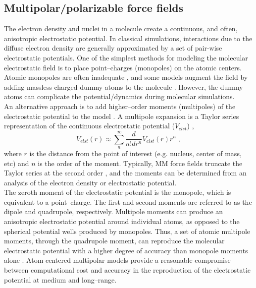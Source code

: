 \documentclass[12pt]{report}
\begin{document}
\subsection{Multipolar/polarizable force fields}

The electron density and nuclei in a molecule create a continuous, and often,
anisotropic electrostatic potential.
In classical simulations, interactions due to the diffuse electron density are
generally approximated by a set of pair-wise electrostatic potentials.
One of the simplest methods for modeling the molecular electrostatic field is
to place point--charges (monopoles) on the atomic centers.
Atomic monopoles are often inadequate \cite{Cisneros2014,Kramer2014}, and
some models augment the field by adding massless charged dummy atoms to the
molecule \cite{Jorgensen1983,Mahoney2000}.
However, the dummy atoms can complicate the potential/dynamics during
molecular simulations. \\

An alternative approach is to add higher--order moments (multipoles) of the
electrostatic potential to the model
\cite{Cisneros2014,Laury2015,Shi2013,Stone2013}.
A multipole expansion is a Taylor series representation of the continuous
electrostatic potential ($V_{elst}$) \cite{Stone2013},
\begin{equation}
 V_{elst}(r) \approx \sum_n^\infty \frac{d}{n!dr^n} V_{elst}(r)r^n \; ,
\end{equation}
where $r$ is the distance from the point of interest (e.g. nucleus, center of
mass, etc) and $n$ is the order of the moment.
Typically, MM force fields truncate the Taylor series at the second order
\cite{Cisneros2014,Laury2015,Shi2013}, and the moments can be determined
from an analysis of the electron density or electrostatic potential. \\

The zeroth moment of the electrostatic potential is the monopole, which is
equivalent to a point--charge.
The first and second moments are referred to as the dipole and quadrupole,
respectively. Multipole moments can produce an anisotropic electrostatic
potential around individual atoms, as opposed to the spherical potential
wells produced by monopoles.
Thus, a set of atomic multipole moments, through the quadrupole moment, can
reproduce the molecular electrostatic potential with a higher degree of
accuracy than monopole moments alone \cite{Cisneros2014,Stone2013}.
Atom centered multipolar models provide a reasonable compromise between
computational cost and accuracy in the reproduction of the electrostatic
potential at medium and long--range.
\end{document}
